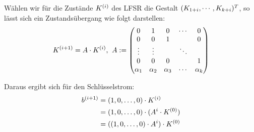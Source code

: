 Wählen wir für die Zustände $K^{(i)}$ des LFSR die Gestalt $(K_{1 + i},\cdots, K_{k + i})^T$, so lässt sich ein Zustandsübergang wie folgt darstellen:
\begin{align*}
	K^{(i+1)} = A \cdot K^{(i)} \text{,} \; \;
	A := \begin{pmatrix}
			0 & 1 & 0 & \cdots & 0 \\
			0 & 0 & 1 & & 0 \\
			\vdots & \vdots & & \ddots & \\
			0 & 0 & 0 & & 1 \\
			\alpha_1 & \alpha_2 & \alpha_3 & \cdots & \alpha_k
	\end{pmatrix}
\end{align*}

Daraus ergibt sich für den Schlüsselstrom:
\begin{align*}
	b^{(i+1)}  & =  (1,0,\dots,0) \cdot K^{(i)} \\ & = (1,0,\dots,0) \cdot (A^i \cdot K^{(0)}) \\ & = ((1,0,\dots,0) \cdot A^i) \cdot K^{(0)}
\end{align*}

